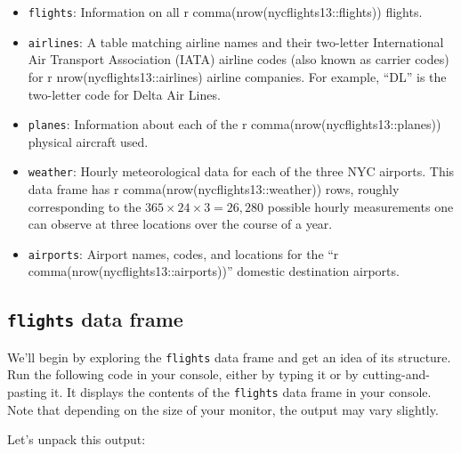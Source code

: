 \documentclass[]{book}
\providecommand{\tightlist}{%
  \setlength{\itemsep}{0pt}\setlength{\parskip}{0pt}}
\begin{document}
\begin{itemize}
\tightlist
\item
  \texttt{flights}: Information on all r comma(nrow(nycflights13::flights)) flights.
\item
  \texttt{airlines}: A table matching airline names and their two-letter International Air Transport Association (IATA) airline codes (also known as carrier codes) for r nrow(nycflights13::airlines) airline companies. For example, ``DL'' is the two-letter code for Delta Air Lines.
\item
  \texttt{planes}: Information about each of the r comma(nrow(nycflights13::planes)) physical aircraft used.
\item
  \texttt{weather}: Hourly meteorological data for each of the three NYC airports. This data frame has r comma(nrow(nycflights13::weather)) rows, roughly corresponding to the \(365 \times 24 \times 3 = 26,280\) possible hourly measurements one can observe at three locations over the course of a year.
\item
  \texttt{airports}: Airport names, codes, and locations for the ``r comma(nrow(nycflights13::airports))'' domestic destination airports.
\end{itemize}

\hypertarget{flights-data-frame}{%
\subsection{\texorpdfstring{\texttt{flights} data frame}{flights data frame}}\label{flights-data-frame}}

We'll begin by exploring the \texttt{flights} data frame and get an idea of its structure. Run the following code in your console, either by typing it or by cutting-and-pasting it. It displays the contents of the \texttt{flights} data frame in your console. Note that depending on the size of your monitor, the output may vary slightly.

Let's unpack this output:
\end{document}
